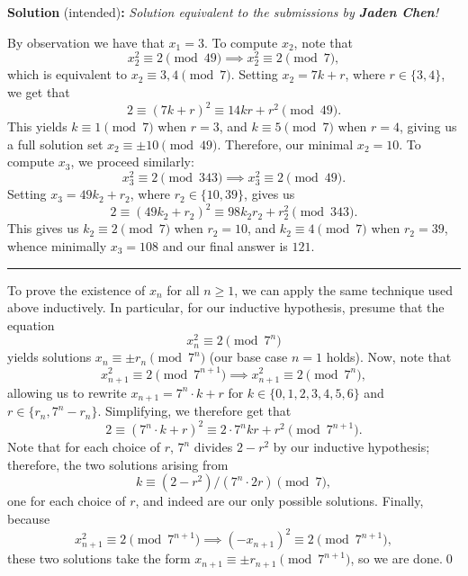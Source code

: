 
\begin{solution}
\textbf{Solution} (intended)\textbf{:}\newline
\textit{Solution equivalent to the submissions by \textbf{Jaden Chen}!}\V

By observation we have that $x_1=3$. To compute $x_2$, note that 
\[x_2^2\equiv 2\pmod{49} \implies x_2^2\equiv 2\pmod{7},\]
which is equivalent to $x_2\equiv 3,4\pmod{7}$. Setting $x_2 = 7k+r$, where $r\in \{3,4\}$, we get that 
\[2\equiv (7k+r)^2\equiv 14kr+r^2\pmod{49}.\]
This yields $k\equiv 1\pmod{7}$ when $r=3$, and $k\equiv 5\pmod{7}$ when $r=4$, giving us a full solution set $x_2\equiv \pm10\pmod{49}$. Therefore, our minimal $x_2 = 10$. To compute $x_3$, we proceed similarly: 
\[x_3^2\equiv 2\pmod{343}\implies x_3^2\equiv 2\pmod{49}.\]
Setting $x_3 = 49k_2+r_2$, where $r_2\in \{10, 39\}$, gives us 
\[2\equiv (49k_2+r_2)^2\equiv 98k_2r_2 + r_2^2\pmod{343}.\]
This gives us $k_2\equiv 2\pmod{7}$ when $r_2=10$, and $k_2\equiv 4\pmod{7}$ when $r_2=39$, whence minimally $x_3=108$ and our final answer is $121$.\V

\vspace{0cm}\rule{\textwidth}{0.3pt} \vspace{0.3cm}

To prove the existence of $x_n$ for all $n\geq 1$, we can apply the same technique used above inductively. In particular, for our inductive hypothesis, presume that the equation 
\[x_n^2\equiv 2\pmod{7^n}\]
yields solutions $x_n\equiv \pm r_n\pmod{7^n}$ (our base case $n=1$ holds). Now, note that 
\[x_{n+1}^2\equiv 2\pmod{7^{n+1}}\implies x_{n+1}^2\equiv 2\pmod{7^n},\]
allowing us to rewrite $x_{n+1} = 7^{n}\cdot k + r$ for $k\in \{0,1,2,3,4,5,6\}$ and $r\in \{r_n, 7^{n}-r_n\}$. Simplifying, we therefore get that 
\[2\equiv (7^n\cdot k + r)^2 \equiv 2\cdot 7^nkr + r^2\pmod{7^{n+1}}.\]
Note that for each choice of $r$, $7^n$ divides $2-r^2$ by our inductive hypothesis; therefore, the two solutions arising from
\[k \equiv (2-r^2)/(7^n\cdot 2r) \pmod{7},\]
one for each choice of $r$, and indeed are our only possible solutions. Finally, because \[x_{n+1}^2 \equiv 2\pmod{7^{n+1}}\implies (-x_{n+1})^2\equiv 2\pmod{7^{n+1}},\] these two solutions take the form $x_{n+1}\equiv \pm r_{n+1}\pmod{7^{n+1}}$, so we are done.\qed
\end{solution}